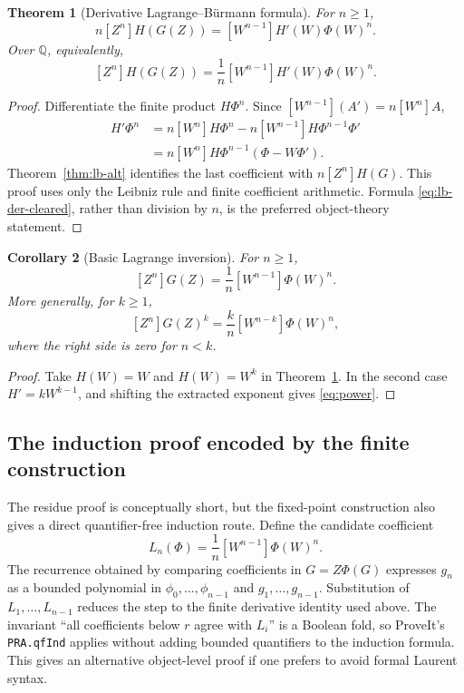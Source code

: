 \documentclass[11pt]{article}
\newtheorem{theorem}{Theorem}[section]
\newtheorem{corollary}[theorem]{Corollary}
\theoremstyle{definition}
\newcommand{\Q}{\mathbb Q}
\newcommand{\code}[1]{\texttt{#1}}
\begin{document}
\begin{theorem}[Derivative Lagrange--B\"urmann formula]\label{thm:lb-der}
For \(n\ge1\),
\begin{equation}\label{eq:lb-der-cleared}
 n[Z^n]H(G(Z))=[W^{n-1}]H'(W)\Phi(W)^n.
\end{equation}
Over \(\Q\), equivalently,
\begin{equation}\label{eq:lb-der}
 [Z^n]H(G(Z))=\frac1n[W^{n-1}]H'(W)\Phi(W)^n.
\end{equation}
\end{theorem}
\begin{proof}
Differentiate the finite product \(H\Phi^n\).  Since
\([W^{n-1}](A')=n[W^n]A\),
\begin{align*}
 [W^{n-1}]H'\Phi^n
 &=n[W^n]H\Phi^n
   -n[W^{n-1}]H\Phi^{n-1}\Phi'\\
 &=n[W^n]H\Phi^{n-1}(\Phi-W\Phi').
\end{align*}
Theorem~\ref{thm:lb-alt} identifies the last coefficient with
\(n[Z^n]H(G)\).  This proof uses only the Leibniz rule and finite coefficient
arithmetic.  Formula \eqref{eq:lb-der-cleared}, rather than division by \(n\),
is the preferred object-theory statement.
\end{proof}

\begin{corollary}[Basic Lagrange inversion]\label{cor:basic}
For \(n\ge1\),
\begin{equation}\label{eq:basic}
 [Z^n]G(Z)=\frac1n[W^{n-1}]\Phi(W)^n.
\end{equation}
More generally, for \(k\ge1\),
\begin{equation}\label{eq:power}
 [Z^n]G(Z)^k=\frac{k}{n}[W^{n-k}]\Phi(W)^n,
\end{equation}
where the right side is zero for \(n<k\).
\end{corollary}
\begin{proof}
Take \(H(W)=W\) and \(H(W)=W^k\) in
Theorem~\ref{thm:lb-der}.  In the second case
\(H'=kW^{k-1}\), and shifting the extracted exponent gives
\eqref{eq:power}.
\end{proof}

\subsection{The induction proof encoded by the finite construction}

The residue proof is conceptually short, but the fixed-point construction also
gives a direct quantifier-free induction route.  Define the candidate
coefficient
\[
 L_n(\Phi)=\frac1n[W^{n-1}]\Phi(W)^n.
\]
The recurrence obtained by comparing coefficients in \(G=Z\Phi(G)\) expresses
\(g_n\) as a bounded polynomial in \(\phi_0,\ldots,\phi_{n-1}\) and
\(g_1,\ldots,g_{n-1}\).  Substitution of \(L_1,\ldots,L_{n-1}\) reduces the
step to the finite derivative identity used above.  The invariant
``all coefficients below \(r\) agree with \(L_i\)'' is a Boolean fold, so
ProveIt's \code{PRA.qfInd} applies without adding bounded quantifiers to the
induction formula.  This gives an alternative object-level proof if one prefers
to avoid formal Laurent syntax.
\end{document}
